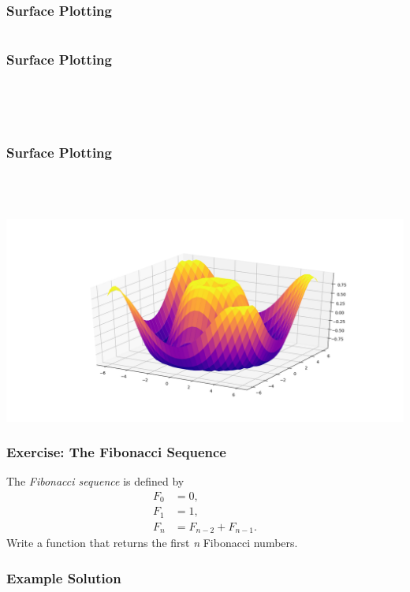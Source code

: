 \documentclass{beamer}
\begin{document}
\begin{frame}[fragile]
  \frametitle{Surface Plotting}
  \inputminted[firstline=1,lastline=7]{pycon}{code/plot.txt}
\end{frame}

\begin{frame}[fragile]
  \frametitle{Surface Plotting}
  \inputminted[firstline=8,lastline=8]{pycon}{code/plot.txt}
  \codepause
  \inputminted[firstline=9,lastline=9]{pycon}{code/plot.txt}
  \codepause
  \inputminted[firstline=10,lastline=12]{pycon}{code/plot.txt}
  \codepause
  \inputminted[firstline=13,lastline=13]{pycon}{code/plot.txt}
  \codepause
  \inputminted[firstline=14,lastline=15]{pycon}{code/plot.txt}
\end{frame}

\begin{frame}[fragile]
  \frametitle{Surface Plotting}
  \inputminted[firstline=16,lastline=16]{pycon}{code/plot.txt}
  \codepause
  \inputminted[firstline=17,lastline=17]{pycon}{code/plot.txt}
  \codepause
  \inputminted[firstline=18,lastline=18]{pycon}{code/plot.txt}
  \codepause
  \inputminted[firstline=19,lastline=19]{pycon}{code/plot.txt}
\end{frame}

\begin{frame}
  \centerline{\includegraphics[scale=0.5]{image/plot_surface.png}}
\end{frame}

\begin{frame}
  \frametitle{Exercise: The Fibonacci Sequence}
  The \emph{Fibonacci sequence} is defined by
  \begin{align*}
    F_0 &= 0,
    \\
    F_1 &= 1,
    \\
    F_{n} &= F_{n-2} + F_{n-1} .
  \end{align*}
  Write a function that returns the first \emph{n} Fibonacci numbers.
\end{frame}

\begin{frame}[fragile]
  \frametitle{Example Solution}
  \inputminted[firstline=1,lastline=7]{python}{code/fibonacci.txt}
\end{frame}
\end{document}
